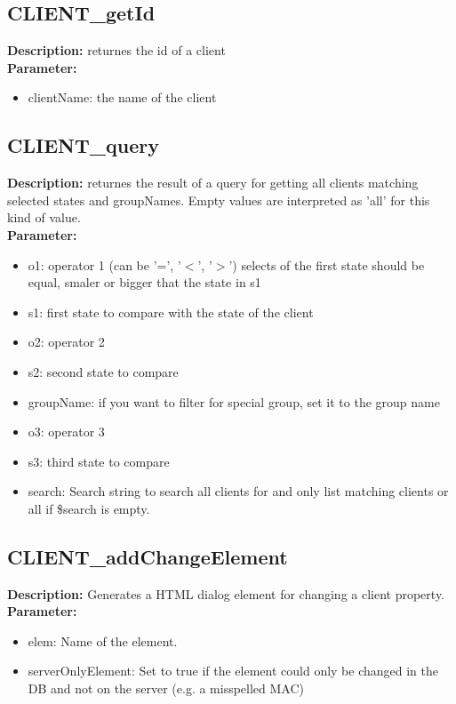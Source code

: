 \subsection{CLIENT\_getId}
\textbf{Description:} returnes the id of a client\\
\textbf{Parameter:}
\begin{itemize}
\item clientName: the name of the client
\end{itemize}

\subsection{CLIENT\_query}
\textbf{Description:} returnes the result of a query for getting all clients matching selected states and groupNames. Empty values are interpreted as 'all' for this kind of value.\\
\textbf{Parameter:}
\begin{itemize}
\item o1: operator 1 (can be '=', '$<$', '$>$') selects of the first state should be equal, smaler or bigger that the state in s1
\item s1: first state to compare with the state of the client
\item o2: operator 2
\item s2: second state to compare
\item groupName: if you want to filter for special group, set it to the group name
\item o3: operator 3
\item s3: third state to compare
\item search: Search string to search all clients for and only list matching clients or all if \$search is empty.
\end{itemize}

\subsection{CLIENT\_addChangeElement}
\textbf{Description:} Generates a HTML dialog element for changing a client property.\\
\textbf{Parameter:}
\begin{itemize}
\item elem: Name of the element.
\item serverOnlyElement: Set to true if the element could only be changed in the DB and not on the server (e.g. a misspelled MAC)
\end{itemize}

